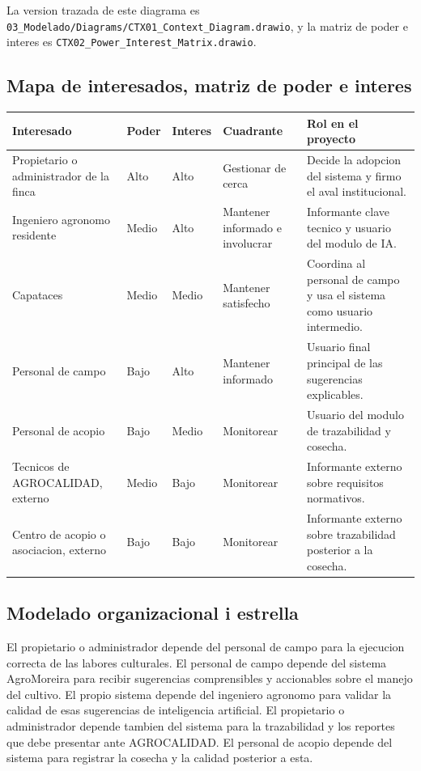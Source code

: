 \documentclass[11pt,a4paper]{article}
\newcommand{\ruta}[1]{\texttt{#1}}
\begin{document}
La version trazada de este diagrama es \ruta{03\_Modelado/Diagrams/CTX01\_Context\_Diagram.drawio}, y la matriz de poder e interes es \ruta{CTX02\_Power\_Interest\_Matrix.drawio}.

\subsection{Mapa de interesados, matriz de poder e interes}

\begin{longtable}{L{3.4cm} L{1.4cm} L{1.4cm} L{2.6cm} L{5.4cm}}
\toprule
\textbf{Interesado} & \textbf{Poder} & \textbf{Interes} & \textbf{Cuadrante} & \textbf{Rol en el proyecto} \\
\midrule
\endhead
Propietario o administrador de la finca & Alto & Alto & Gestionar de cerca & Decide la adopcion del sistema y firmo el aval institucional. \\
\addlinespace
Ingeniero agronomo residente & Medio & Alto & Mantener informado e involucrar & Informante clave tecnico y usuario del modulo de IA. \\
\addlinespace
Capataces & Medio & Medio & Mantener satisfecho & Coordina al personal de campo y usa el sistema como usuario intermedio. \\
\addlinespace
Personal de campo & Bajo & Alto & Mantener informado & Usuario final principal de las sugerencias explicables. \\
\addlinespace
Personal de acopio & Bajo & Medio & Monitorear & Usuario del modulo de trazabilidad y cosecha. \\
\addlinespace
Tecnicos de AGROCALIDAD, externo & Medio & Bajo & Monitorear & Informante externo sobre requisitos normativos. \\
\addlinespace
Centro de acopio o asociacion, externo & Bajo & Bajo & Monitorear & Informante externo sobre trazabilidad posterior a la cosecha. \\
\bottomrule
\end{longtable}

\subsection{Modelado organizacional i estrella}

El propietario o administrador depende del personal de campo para la ejecucion correcta de las labores culturales. El personal de campo depende del sistema AgroMoreira para recibir sugerencias comprensibles y accionables sobre el manejo del cultivo. El propio sistema depende del ingeniero agronomo para validar la calidad de esas sugerencias de inteligencia artificial. El propietario o administrador depende tambien del sistema para la trazabilidad y los reportes que debe presentar ante AGROCALIDAD. El personal de acopio depende del sistema para registrar la cosecha y la calidad posterior a esta.
\end{document}
